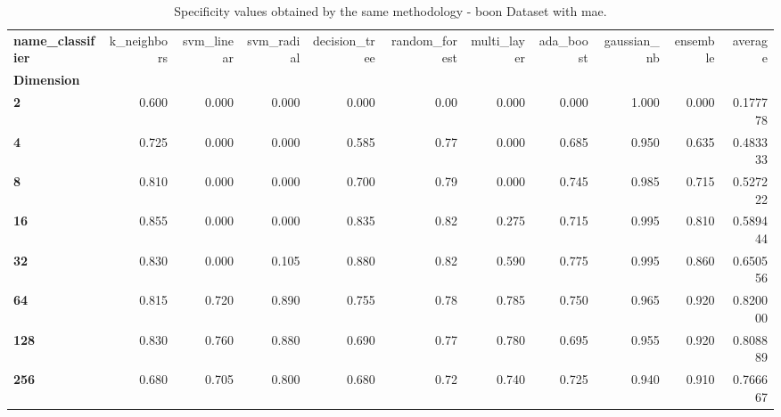 \begin{table}
\centering
\caption{Specificity values obtained by the same methodology - boon Dataset with mae.}
\label{specificity_boon_mae-reproduction}
\begin{tabular}{lrrrrrrrrrr}
\toprule
\textbf{name\_classifier} &  k\_neighbors &  svm\_linear &  svm\_radial &  decision\_tree &  random\_forest &  multi\_layer &  ada\_boost &  gaussian\_nb &  ensemble &   average \\
\textbf{Dimension} &              &             &             &                &                &              &            &              &           &           \\
\midrule
\textbf{2        } &        0.600 &       0.000 &       0.000 &          0.000 &           0.00 &        0.000 &      0.000 &        1.000 &     0.000 &  0.177778 \\
\textbf{4        } &        0.725 &       0.000 &       0.000 &          0.585 &           0.77 &        0.000 &      0.685 &        0.950 &     0.635 &  0.483333 \\
\textbf{8        } &        0.810 &       0.000 &       0.000 &          0.700 &           0.79 &        0.000 &      0.745 &        0.985 &     0.715 &  0.527222 \\
\textbf{16       } &        0.855 &       0.000 &       0.000 &          0.835 &           0.82 &        0.275 &      0.715 &        0.995 &     0.810 &  0.589444 \\
\textbf{32       } &        0.830 &       0.000 &       0.105 &          0.880 &           0.82 &        0.590 &      0.775 &        0.995 &     0.860 &  0.650556 \\
\textbf{64       } &        0.815 &       0.720 &       0.890 &          0.755 &           0.78 &        0.785 &      0.750 &        0.965 &     0.920 &  0.820000 \\
\textbf{128      } &        0.830 &       0.760 &       0.880 &          0.690 &           0.77 &        0.780 &      0.695 &        0.955 &     0.920 &  0.808889 \\
\textbf{256      } &        0.680 &       0.705 &       0.800 &          0.680 &           0.72 &        0.740 &      0.725 &        0.940 &     0.910 &  0.766667 \\
\bottomrule
\end{tabular}
\end{table}
